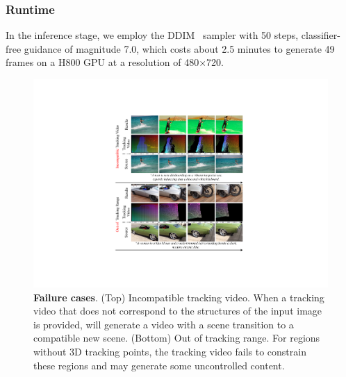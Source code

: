 
\subsubsection{Runtime}
In the inference stage, we employ the DDIM~\cite{song2020denoising} sampler with 50 steps, classifier-free guidance of magnitude 7.0, which costs about 2.5 minutes to generate 49 frames on a H800 GPU at a resolution of 480$\times$720.

\begin{figure}
    \centering
    \includegraphics[width=\linewidth]{pictures/tracking.pdf}
    \caption{\textbf{Failure cases}. (Top) Incompatible tracking video. When a tracking video that does not correspond to the structures of the input image is provided, \methodname will generate a video with a scene transition to a compatible new scene.
    (Bottom) Out of tracking range. For regions without 3D tracking points, the tracking video fails to constrain these regions and \methodname may generate some uncontrolled content.} 
    \label{fig:tracking1}
\end{figure}